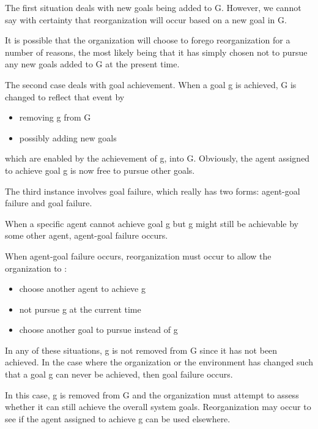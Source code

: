 The first situation deals with new goals being added to G. However, \cite{omacs2}
we cannot say with certainty that reorganization will occur based on a new goal in G. 

It is possible that the organization will choose to forego reorganization for a number of reasons, the most likely being that it has simply chosen not to pursue any new goals added to G at the present time.

The second case deals with goal achievement. When a goal g is achieved, G is changed to reflect that event by 

\begin{itemize}
\newcommand{\localtextbulletone}{\textcolor{gray}{\raisebox{.45ex}{\rule{.6ex}{.6ex}}}}
\renewcommand{\labelitemi}{\localtextbulletone}
\item removing g from G
\item possibly adding new goals
\end{itemize}	

 which are enabled by the achievement of g, into G. Obviously, the agent assigned to achieve goal g is now free to pursue other goals. 

The third instance involves goal failure, which really has two forms: agent-goal failure and goal failure.

When a specific agent cannot achieve goal g but g might still be achievable by some other agent, 
agent-goal failure occurs. 

When agent-goal failure occurs, reorganization must occur to allow the organization to :

\begin{itemize}
\newcommand{\localtextbulletone}{\textcolor{gray}{\raisebox{.45ex}{\rule{.6ex}{.6ex}}}}
\renewcommand{\labelitemi}{\localtextbulletone}
\item choose another agent to achieve g
\item not pursue g at the current time
\item choose another goal to pursue instead of g
\end{itemize}	
 
In any of these situations, g is not removed from G since it has not been achieved. In the case where the organization or the environment has changed such that a goal g can never be achieved, then goal failure occurs. 

In this case, g is removed from G and the organization must attempt to assess whether it can still achieve the overall system goals. Reorganization may occur to see if the agent assigned to achieve g can be used elsewhere. 

